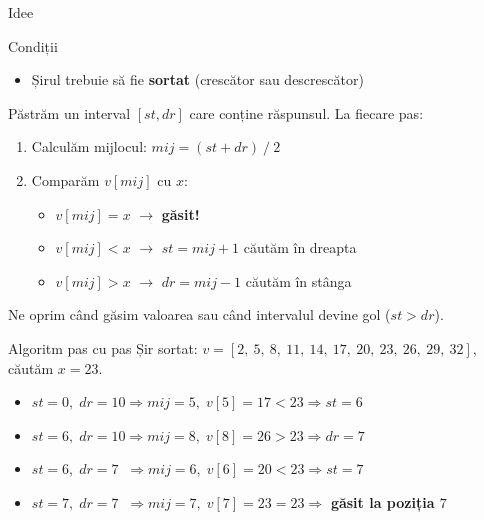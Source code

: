 ﻿\documentclass{beamer}
\begin{document}
\begin{frame}{Idee}
  \begin{block}{Condiții}
    \begin{itemize}
      \item Șirul trebuie să fie \textbf{sortat} (crescător sau descrescător)
    \end{itemize}
  \end{block}

  \smallskip
  Păstrăm un interval $[st, dr]$ care conține răspunsul. La fiecare pas:
  \begin{enumerate}
    \item Calculăm mijlocul: $mij = (st + dr) \ / \ 2$
    \item Comparăm $v[mij]$ cu $x$:
    \begin{itemize}
      \item $v[mij] = x$ $\rightarrow$ \textbf{găsit!}
      \item $v[mij] < x$ $\rightarrow$ $st = mij + 1$ \textemdash{} căutăm în dreapta
      \item $v[mij] > x$ $\rightarrow$ $dr = mij - 1$ \textemdash{} căutăm în stânga
    \end{itemize}
  \end{enumerate}
  \smallskip
  Ne oprim când găsim valoarea sau când intervalul devine gol ($st > dr$).
\end{frame}

\begin{frame}{Algoritm pas cu pas}
  Șir sortat: $v = [2,\ 5,\ 8,\ 11,\ 14,\ 17,\ 20,\ 23,\ 26,\ 29,\ 32]$, căutăm $x = 23$.

  \smallskip
  \begin{itemize}
    \item $st=0,\;dr=10 \Rightarrow mij=5,\;v[5]=17 < 23 \Rightarrow st = 6$
    \item $st=6,\;dr=10 \Rightarrow mij=8,\;v[8]=26 > 23 \Rightarrow dr = 7$
    \item $st=6,\;dr=7\;\;\Rightarrow mij=6,\;v[6]=20 < 23 \Rightarrow st = 7$
    \item $st=7,\;dr=7\;\;\Rightarrow mij=7,\;v[7]=23 = 23 \Rightarrow$ \textbf{găsit la poziția $7$} \checkmark
  \end{itemize}
\end{frame}
\end{document}
